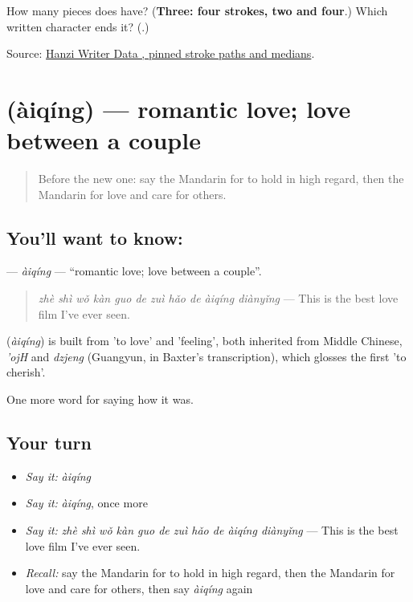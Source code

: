 \begin{tcolorbox}[breakable,colback=teal!4,colframe=teal!35!black,title={Before you move on}]
How many pieces does  have? (\textbf{Three: four strokes, two and four}.) Which written character ends it? (\textbf{}.)

Source: \href{https://raw.githubusercontent.com/chanind/hanzi-writer-data/68d10a4b21150cae5e1ebbd223eed289cf32d90c/data/\%E7\%88\%B1.json}{Hanzi Writer Data , pinned stroke paths and medians}.
\end{tcolorbox}
\section[\texorpdfstring{\zh{爱情} (àiqíng)}{爱情 (àiqíng)}]{ (àiqíng) — romantic love; love between a couple}

\label{lesson:ZH-C461-aiqing}



\begin{quote}
Before the new one: say the Mandarin for to hold in high regard, then the Mandarin for love and care for others.
\end{quote}

\subsection*{You'll want to know: }
\textbf{} — \emph{àiqíng} — \textquotedblleft{}romantic love; love between a couple\textquotedblright{}.

\begin{quote}
\emph{zhè shì wǒ kàn guo de zuì hǎo de àiqíng diànyǐng} — This is the best love film I've ever seen.
\end{quote}

\begin{cousinweb}
\textbf{} (\emph{àiqíng}) is built from  'to love' and  'feeling', both inherited from Middle Chinese, \emph{'ojH} and \emph{dzjeng} (Guangyun, in Baxter's transcription), which glosses the first 'to cherish'.
\end{cousinweb}

\begin{grammarlens}[title={What you've built}]
One more word for saying how it was.
\end{grammarlens}

\subsection*{Your turn}
\begin{itemize}
\raggedright
  \item \emph{Say it:} \emph{àiqíng}
  \item \emph{Say it:} \emph{àiqíng}, once more
  \item \emph{Say it:} \emph{zhè shì wǒ kàn guo de zuì hǎo de àiqíng diànyǐng} — This is the best love film I've ever seen.
  \item \emph{Recall:} say the Mandarin for to hold in high regard, then the Mandarin for love and care for others, then say \emph{àiqíng} again
\end{itemize}

